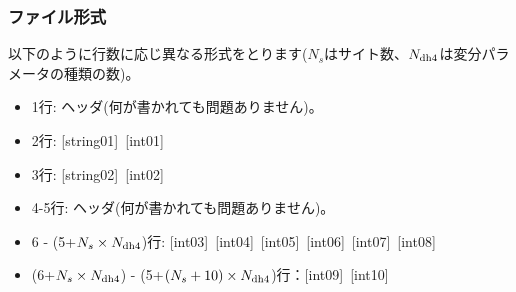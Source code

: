 \subsubsection{ファイル形式}
以下のように行数に応じ異なる形式をとります($N_s$はサイト数、$N_{\rm dh4}$は変分パラメータの種類の数)。
 \begin{itemize}
   \item  1行:  ヘッダ(何が書かれても問題ありません)。
   \item  2行:   [string01]~[int01]
   \item  3行:   [string02]~[int02]
   \item  4-5行:  ヘッダ(何が書かれても問題ありません)。
   \item  6 - (5+$N_s\times N_{\rm dh4}$)行: [int03]~[int04]~[int05]~[int06]~[int07]~[int08]
   \item  (6+$N_s\times N_{\rm dh4}$) - (5+$(N_s+10) \times N_{\rm dh4}$)行：[int09]~[int10]
  \end{itemize}
